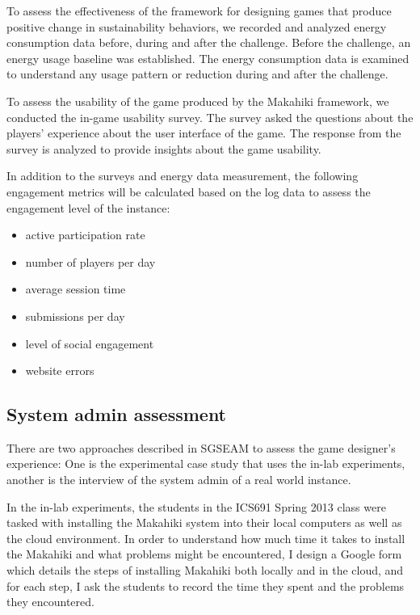 To assess the effectiveness of the framework for designing games that produce positive change in sustainability
behaviors, we recorded and analyzed energy consumption data before, during and after the
challenge.  Before the challenge, an energy usage baseline was established. The energy consumption data is examined to understand any usage pattern or reduction during and after the challenge.

To assess the usability of the game produced by the Makahiki framework, we conducted the in-game usability survey. The survey asked the questions about the players' experience about the user interface of the game. The response from the survey is analyzed to provide insights about the game usability.

In addition to the surveys and energy data measurement, the following engagement metrics will be calculated based on the log data to assess the engagement level of the instance:

\begin{itemize}
\item active participation rate
\item number of players per day
\item average session time
\item submissions per day
\item level of social engagement
\item website errors
\end{itemize}

\subsection{System admin assessment}

There are two approaches described in SGSEAM to assess the game designer's experience: One is the experimental case study that uses the in-lab experiments, another is the interview of the system admin of a real world instance.

In the in-lab experiments, the students in the ICS691 Spring 2013 class were tasked with installing the Makahiki system into their local computers as well as the cloud environment. In order to understand how much time it takes to install the Makahiki and what problems might be encountered, I design a Google form which details the steps of installing Makahiki both locally and in the cloud, and for each step, I ask the students to record the time they spent and the problems they encountered.

